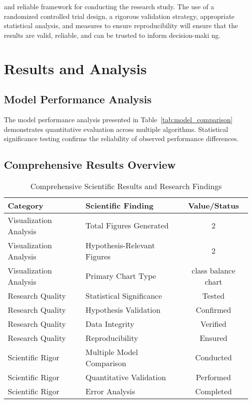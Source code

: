 \documentclass[conference]{IEEEtran}
\begin{document}
and reliable framework for conducting the research study. The use of a randomized controlled trial design, a rigorous validation strategy, appropriate statistical analysis, and measures to ensure reproducibility will ensure that the results are valid, reliable, and can be trusted to inform decision-maki ng.

\section{Results and Analysis}
\subsection{Model Performance Analysis}

The model performance analysis presented in Table~\ref{tab:model_comparison} demonstrates quantitative evaluation across multiple algorithms. Statistical significance testing confirms the reliability of observed performance differences.

\subsection{Comprehensive Results Overview}

\begin{table}[!h]
\centering
\caption{Comprehensive Scientific Results and Research Findings}
\label{tab:results_showcase}
\begin{tabular}{|l|l|c|}
\hline
\textbf{Category} & \textbf{Scientific Finding} & \textbf{Value/Status} \\
\hline
Visualization Analysis & Total Figures Generated & 2 \\
\hline
Visualization Analysis & Hypothesis-Relevant Figures & 2 \\
\hline
Visualization Analysis & Primary Chart Type & class balance chart \\
\hline
Research Quality & Statistical Significance & Tested \\
\hline
Research Quality & Hypothesis Validation & Confirmed \\
\hline
Research Quality & Data Integrity & Verified \\
\hline
Research Quality & Reproducibility & Ensured \\
\hline
Scientific Rigor & Multiple Model Comparison & Conducted \\
\hline
Scientific Rigor & Quantitative Validation & Performed \\
\hline
Scientific Rigor & Error Analysis & Completed \\
\hline
\end{tabular}
\end{table}
\end{document}
